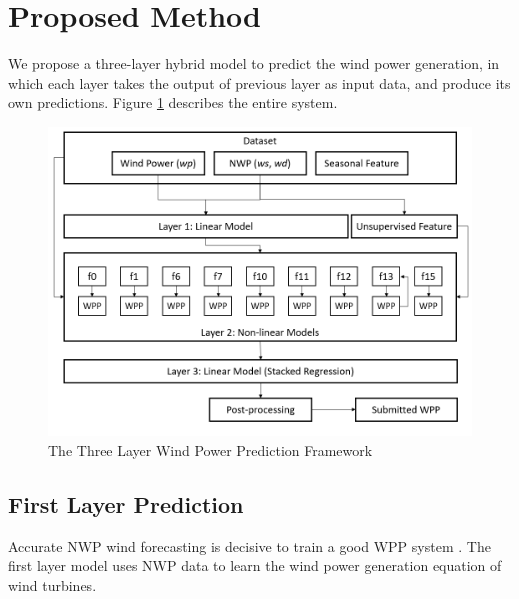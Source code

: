 \documentclass[conference]{IEEEtran}
\begin{document}
\section{Proposed Method}

We propose a three-layer hybrid model to predict the wind power generation, in which each layer takes the output of previous layer as input data, and produce its own predictions. %
Figure \ref{fig:flowchart} describes the entire system. %
\begin{figure}[b]
\centering
\includegraphics[width=0.9\columnwidth]{FIG/flowchart}
\caption{The Three Layer Wind Power Prediction Framework}
\label{fig:flowchart}
\end{figure}

\subsection{First Layer Prediction}
Accurate NWP wind forecasting is decisive to train a good WPP system \cite{WANG20171345}. The first layer model uses NWP data to learn the wind power generation equation of wind turbines.
\end{document}
